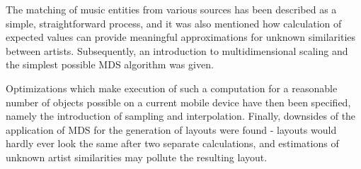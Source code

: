 The matching of music entities from various sources has been described as a simple, straightforward process, and it was also mentioned how calculation of expected values can provide meaningful approximations for unknown similarities between artists. Subsequently, an introduction to multidimensional scaling and the simplest possible MDS algorithm was given. 

Optimizations which make execution of such a computation for a reasonable number of objects possible on a current mobile device have then been specified, namely the introduction of sampling and interpolation. Finally, downsides of the application of MDS for the generation of layouts were found - layouts would hardly ever look the same after two separate calculations, and estimations of unknown artist similarities may pollute the resulting layout.